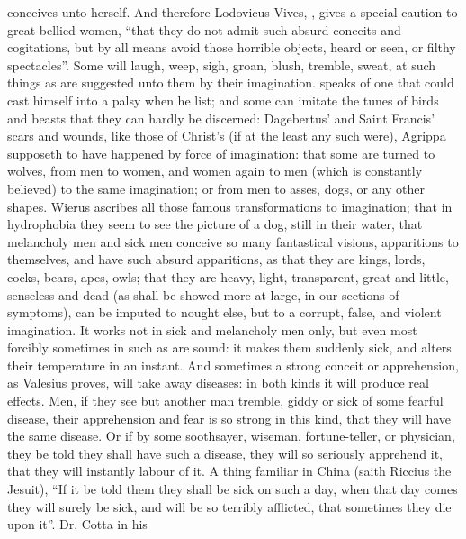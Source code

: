 conceives unto herself. And therefore Lodovicus Vives,
, gives a special caution to
great-bellied women, \enquote{that they do not admit such absurd
conceits and cogitations, but by all means avoid those horrible objects, heard
or seen, or filthy spectacles}. Some will laugh, weep, sigh, groan, blush,
tremble, sweat, at such things as are suggested unto them by their imagination.
\Avicenna{} speaks of one that could cast himself into a palsy when he list; and
some can imitate the tunes of birds and beasts that they can hardly be
discerned: Dagebertus' and Saint Francis' scars and wounds, like those of
Christ's (if at the least any such were), Agrippa
supposeth to have happened by force of imagination: that some are turned to
wolves, from men to women, and women again to men (which is constantly
believed) to the same imagination; or from men to asses, dogs, or any other
shapes. Wierus ascribes all those famous transformations
to imagination; that in hydrophobia they seem to see the picture of a dog,
still in their water, that melancholy men and sick men
conceive so many fantastical visions, apparitions to themselves, and have such
absurd apparitions, as that they are kings, lords, cocks, bears, apes, owls;
that they are heavy, light, transparent, great and little, senseless and dead
(as shall be showed more at large, in our sections of
symptoms), can be imputed to nought else, but to a corrupt, false, and violent
imagination. It works not in sick and melancholy men only, but even most
forcibly sometimes in such as are sound: it makes them suddenly sick, and
alters their temperature in an instant. And sometimes a
strong conceit or apprehension, as Valesius proves, will
take away diseases: in both kinds it will produce real effects. Men, if they
see but another man tremble, giddy or sick of some fearful disease, their
apprehension and fear is so strong in this kind, that they will have the same
disease. Or if by some soothsayer, wiseman, fortune-teller, or physician, they
be told they shall have such a disease, they will so seriously apprehend it,
that they will instantly labour of it. A thing familiar in China (saith Riccius
the Jesuit), \enquote{If it be told them they shall be sick on
such a day, when that day comes they will surely be sick, and will be so
terribly afflicted, that sometimes they die upon it}. Dr. Cotta in his
